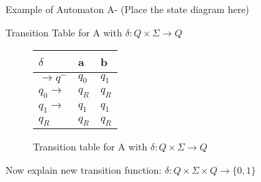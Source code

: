 \documentclass[runningheads,a4paper]{llncs}
\begin{document}
Example of Automaton A- (Place the state diagram here)

Transition Table for A with $\delta: Q \times \Sigma \rightarrow Q$ 

\begin{figure}
\begin{center}

	\setlength{\tabcolsep}{4pt}
	\renewcommand{\arraystretch}{1.5}
	
	\begin{tabular}{|P{1.0cm} || P{0.6cm} | P{0.6cm} |}
	\hline
	$\delta$ & a & b \\
	\hline
	\hline
	$\rightarrow q^-$ 		& $q_0$ & $q_1$ \\
	\hline
	$q_0 \rightarrow$ 		& $q_R$ & $q_R$ \\
	\hline
	$q_1 \rightarrow$ 		& $q_1$ & $q_1$ \\
	\hline
	$q_R$  					& $q_R$ & $q_R$ \\
	\hline
	\end{tabular}

	
\caption{Transition table for A with $\delta: Q \times \Sigma \rightarrow Q$}
\end{center}
\end{figure}




Now explain new transition function: $\delta: Q \times \Sigma \times Q \rightarrow \{0,1\}$
\end{document}
